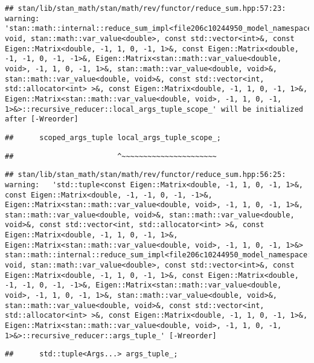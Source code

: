 \documentclass[
]{article}
\begin{document}
\begin{verbatim}
## stan/lib/stan_math/stan/math/rev/functor/reduce_sum.hpp:57:23: warning: 'stan::math::internal::reduce_sum_impl<file206c10244950_model_namespace::partial_log_lik_rsfunctor__, void, stan::math::var_value<double>, const std::vector<int>&, const Eigen::Matrix<double, -1, 1, 0, -1, 1>&, const Eigen::Matrix<double, -1, -1, 0, -1, -1>&, Eigen::Matrix<stan::math::var_value<double, void>, -1, 1, 0, -1, 1>&, stan::math::var_value<double, void>&, stan::math::var_value<double, void>&, const std::vector<int, std::allocator<int> >&, const Eigen::Matrix<double, -1, 1, 0, -1, 1>&, Eigen::Matrix<stan::math::var_value<double, void>, -1, 1, 0, -1, 1>&>::recursive_reducer::local_args_tuple_scope_' will be initialized after [-Wreorder]
\end{verbatim}

\begin{verbatim}
##      scoped_args_tuple local_args_tuple_scope_;
\end{verbatim}

\begin{verbatim}
##                        ^~~~~~~~~~~~~~~~~~~~~~~
\end{verbatim}

\begin{verbatim}
## stan/lib/stan_math/stan/math/rev/functor/reduce_sum.hpp:56:25: warning:   'std::tuple<const Eigen::Matrix<double, -1, 1, 0, -1, 1>&, const Eigen::Matrix<double, -1, -1, 0, -1, -1>&, Eigen::Matrix<stan::math::var_value<double, void>, -1, 1, 0, -1, 1>&, stan::math::var_value<double, void>&, stan::math::var_value<double, void>&, const std::vector<int, std::allocator<int> >&, const Eigen::Matrix<double, -1, 1, 0, -1, 1>&, Eigen::Matrix<stan::math::var_value<double, void>, -1, 1, 0, -1, 1>&> stan::math::internal::reduce_sum_impl<file206c10244950_model_namespace::partial_log_lik_rsfunctor__, void, stan::math::var_value<double>, const std::vector<int>&, const Eigen::Matrix<double, -1, 1, 0, -1, 1>&, const Eigen::Matrix<double, -1, -1, 0, -1, -1>&, Eigen::Matrix<stan::math::var_value<double, void>, -1, 1, 0, -1, 1>&, stan::math::var_value<double, void>&, stan::math::var_value<double, void>&, const std::vector<int, std::allocator<int> >&, const Eigen::Matrix<double, -1, 1, 0, -1, 1>&, Eigen::Matrix<stan::math::var_value<double, void>, -1, 1, 0, -1, 1>&>::recursive_reducer::args_tuple_' [-Wreorder]
\end{verbatim}

\begin{verbatim}
##      std::tuple<Args...> args_tuple_;
\end{verbatim}
\end{document}
